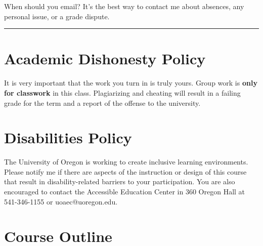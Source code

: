 \documentclass[11pt]{article}
\begin{document}
When should you email? It's the best way to contact me about absences, any personal issue, or a grade dispute.

\noindent\rule{\textwidth}{0.5pt}

\section*{Academic Dishonesty Policy}
\label{sec:org0ebe6a9}

It is very important that the work you turn in is truly yours. Group work is \textbf{only for classwork} in this class. Plagiarizing and cheating will result in a failing grade for the term and a report of the offense to the university.

\section*{Disabilities Policy}
\label{sec:orgcb35d50}

The University of Oregon is working to create inclusive learning environments. Please notify me if there are aspects of the instruction or design of this course that result in disability-related barriers to your participation. You are also encouraged to contact the Accessible Education Center in 360 Oregon Hall at 541-346-1155 or uoaec@uoregon.edu.

\section*{Course Outline}
\label{sec:orgea59917}
\end{document}
